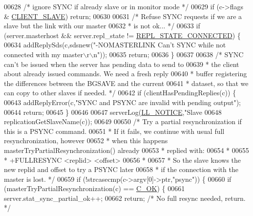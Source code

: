 \begin{DoxyCode}
{{{{{{{{{{{{{{{{{{{{{{{{{{{{{00628     \textcolor{comment}{/* ignore SYNC if already slave or in monitor mode */}
00629     \textcolor{keywordflow}{if} (c->flags & \hyperlink{server_8h_ae9f6995948253652bc9454d79a72f4a7}{CLIENT\_SLAVE}) \textcolor{keywordflow}{return};
00630 
00631     \textcolor{comment}{/* Refuse SYNC requests if we are a slave but the link with our master}
00632 \textcolor{comment}{     * is not ok... */}
00633     \textcolor{keywordflow}{if} (server.masterhost && server.repl\_state != \hyperlink{server_8h_aed693b3a9cdfc05cf5ab7551a8c86fbe}{REPL\_STATE\_CONNECTED}) \{
00634         addReplySds(c,sdsnew(\textcolor{stringliteral}{"-NOMASTERLINK Can't SYNC while not connected with my master\(\backslash\)r\(\backslash\)n"}));
00635         \textcolor{keywordflow}{return};
00636     \}
00637 
00638     \textcolor{comment}{/* SYNC can't be issued when the server has pending data to send to}
00639 \textcolor{comment}{     * the client about already issued commands. We need a fresh reply}
00640 \textcolor{comment}{     * buffer registering the differences between the BGSAVE and the current}
00641 \textcolor{comment}{     * dataset, so that we can copy to other slaves if needed. */}
00642     \textcolor{keywordflow}{if} (clientHasPendingReplies(c)) \{
00643         addReplyError(c,\textcolor{stringliteral}{"SYNC and PSYNC are invalid with pending output"});
00644         \textcolor{keywordflow}{return};
00645     \}
00646 
00647     serverLog(\hyperlink{server_8h_a8c54c191e436c7dd3012167212692401}{LL\_NOTICE},\textcolor{stringliteral}{"Slave %
00648         replicationGetSlaveName(c));
00649 
00650     \textcolor{comment}{/* Try a partial resynchronization if this is a PSYNC command.}
00651 \textcolor{comment}{     * If it fails, we continue with usual full resynchronization, however}
00652 \textcolor{comment}{     * when this happens masterTryPartialResynchronization() already}
00653 \textcolor{comment}{     * replied with:}
00654 \textcolor{comment}{     *}
00655 \textcolor{comment}{     * +FULLRESYNC <replid> <offset>}
00656 \textcolor{comment}{     *}
00657 \textcolor{comment}{     * So the slave knows the new replid and offset to try a PSYNC later}
00658 \textcolor{comment}{     * if the connection with the master is lost. */}
00659     \textcolor{keywordflow}{if} (!strcasecmp(c->argv[0]->ptr,\textcolor{stringliteral}{"psync"})) \{
00660         \textcolor{keywordflow}{if} (masterTryPartialResynchronization(c) == \hyperlink{server_8h_a303769ef1065076e68731584e758d3e1}{C\_OK}) \{
00661             server.stat\_sync\_partial\_ok++;
00662             \textcolor{keywordflow}{return}; \textcolor{comment}{/* No full resync needed, return. */}
}}}}}}}}}}}}}}}}}}}}}}}}}}}}}}
\end{DoxyCode}
